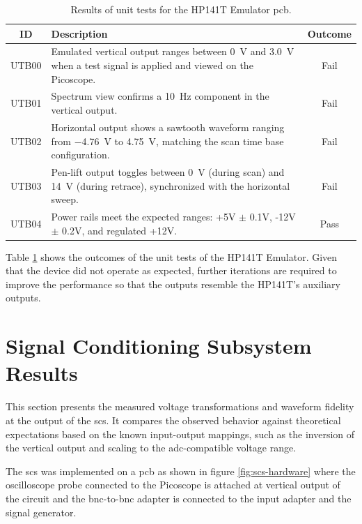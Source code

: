 \documentclass[class=report,11pt,crop=false]{standalone}
\begin{document}
	\begin{table}[ht!]
		\centering
		\begin{tabular}{|c|m{25em}|c|}
			\hline
			\textbf{ID} & \textbf{Description} & \textbf{Outcome} \\
			\hline
			UTB00 & Emulated vertical output ranges between \SI{0}{\volt} and \SI{3.0}{\volt} when a test signal is applied and viewed on the Picoscope. & Fail \\
			\hline
			UTB01 & Spectrum view confirms a \SI{10}{\hertz} component in the vertical output. & Fail \\
			\hline
			UTB02 & Horizontal output shows a sawtooth waveform ranging from \SI{-4.76}{\volt} to \SI{4.75}{\volt}, matching the scan time base configuration. & Fail \\
			\hline
			UTB03 & Pen-lift output toggles between \SI{0}{\volt} (during scan) and \SI{14}{\volt} (during retrace), synchronized with the horizontal sweep. & Fail \\
			\hline
			UTB04 & Power rails meet the expected ranges: +5V $\pm$ 0.1V, -12V $\pm$ 0.2V, and regulated +12V. & Pass \\
			\hline
		\end{tabular}
		\caption{Results of unit tests for the HP141T Emulator \acrshort{pcb}.}
		\label{tab:emulator-unit-tests}
	\end{table}
	Table \ref{tab:emulator-unit-tests} shows the outcomes of the unit tests of the HP141T Emulator. Given that the device did not operate as expected, further iterations are required to improve the performance so that the outputs resemble the HP141T's auxiliary outputs.
	\section{Signal Conditioning Subsystem Results}
	
	This section presents the measured voltage transformations and waveform fidelity at the output of the \acrshort{scs}. It compares the observed behavior against theoretical expectations based on the known input-output mappings, such as the inversion of the vertical output and scaling to the \acrshort{adc}-compatible voltage range.
	
	The \acrshort{scs} was implemented on a \acrshort{pcb} as shown in figure \ref{fig:scs-hardware} where the oscilloscope probe connected to the Picoscope is attached at vertical output of the circuit and the \acrshort{bnc}-to-\acrshort{bnc} adapter is connected to the input adapter and the signal generator. 
	
\end{document}

